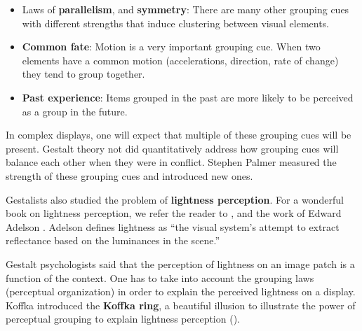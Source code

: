 \begin{itemize}
    \item Laws of {\bf parallelism}, and {\bf symmetry}: There are many other grouping cues with different strengths that induce clustering between visual elements. 
    \item {\bf Common fate}: Motion is a very important grouping cue. When two elements have a common motion (accelerations, direction, rate of change) they tend to group together.
    \item {\bf Past experience}: Items grouped in the past are more likely to be perceived as a group in the future. 
\end{itemize}

 In complex displays, one will expect that multiple of these grouping cues will be present. Gestalt theory not did quantitatively address how grouping cues will balance each other when they were in conflict. Stephen Palmer \cite{Palmer94} measured the strength of these grouping cues and introduced new ones. 

Gestalists also studied the problem of {\bf lightness perception}. 
For a wonderful book on lightness perception, we refer the reader to \cite{gilchrist2006}, and the work of Edward Adelson \cite{Adelson99}. Adelson defines lightness as ``the visual system’s attempt to extract reflectance based on the luminances in the scene.''

Gestalt psychologists said that the perception of lightness on an image patch is a function of the context. One has to take into account the grouping laws (perceptual organization) in order to explain the perceived lightness on a display. Koffka \cite{Koffka1935} introduced the {\bf Koffka ring}, a beautiful illusion to illustrate the power of perceptual grouping to explain lightness perception (\fig{\ref{fig:koffka_ring}}). 

